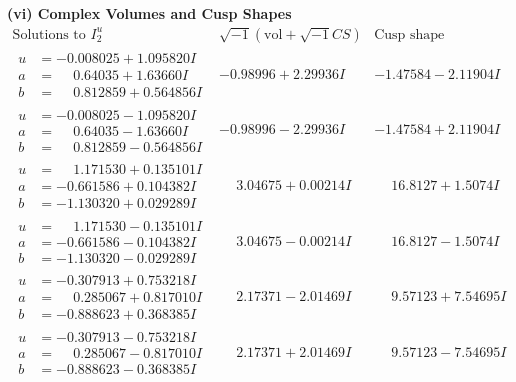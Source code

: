 \documentclass[1p]{elsarticle_modified}
\theoremstyle{definition}
\newcommand{\I}{\sqrt{-1}}
\begin{document}
\newpage\flushleft \textbf{(vi) Complex Volumes and Cusp Shapes}
$$\begin{array}{c|c|c}  
\text{Solutions to }I^u_{2}& \I (\text{vol} + \sqrt{-1}CS) & \text{Cusp shape}\\
 \hline 
\begin{aligned}
u &= -0.008025 + 1.095820 I \\
a &= \phantom{-}0.64035 + 1.63660 I \\
b &= \phantom{-}0.812859 + 0.564856 I\end{aligned}
 & -0.98996 + 2.29936 I & -1.47584 - 2.11904 I \\ \hline\begin{aligned}
u &= -0.008025 - 1.095820 I \\
a &= \phantom{-}0.64035 - 1.63660 I \\
b &= \phantom{-}0.812859 - 0.564856 I\end{aligned}
 & -0.98996 - 2.29936 I & -1.47584 + 2.11904 I \\ \hline\begin{aligned}
u &= \phantom{-}1.171530 + 0.135101 I \\
a &= -0.661586 + 0.104382 I \\
b &= -1.130320 + 0.029289 I\end{aligned}
 & \phantom{-}3.04675 + 0.00214 I & \phantom{-}16.8127 + 1.5074 I \\ \hline\begin{aligned}
u &= \phantom{-}1.171530 - 0.135101 I \\
a &= -0.661586 - 0.104382 I \\
b &= -1.130320 - 0.029289 I\end{aligned}
 & \phantom{-}3.04675 - 0.00214 I & \phantom{-}16.8127 - 1.5074 I \\ \hline\begin{aligned}
u &= -0.307913 + 0.753218 I \\
a &= \phantom{-}0.285067 + 0.817010 I \\
b &= -0.888623 + 0.368385 I\end{aligned}
 & \phantom{-}2.17371 - 2.01469 I & \phantom{-}9.57123 + 7.54695 I \\ \hline\begin{aligned}
u &= -0.307913 - 0.753218 I \\
a &= \phantom{-}0.285067 - 0.817010 I \\
b &= -0.888623 - 0.368385 I\end{aligned}
 & \phantom{-}2.17371 + 2.01469 I & \phantom{-}9.57123 - 7.54695 I \\ \hline\begin{aligned}

\end{aligned}
\end{array}$$
\end{document}
